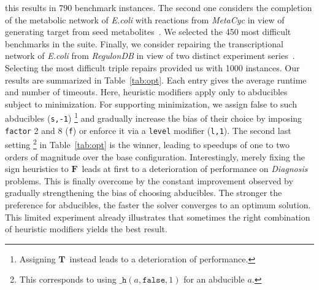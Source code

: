 \documentclass[letterpaper]{article}
\newcommand{\hpredicate}{\texttt{\_h}}
\newcommand{\hpre}[3]{\ensuremath{\hpredicate(#1,{#2},#3)}}
\newcommand{\true}{\ensuremath{\boldsymbol{T}}}
\newcommand{\false}{\ensuremath{\boldsymbol{F}}}
\begin{document}
this results in 790 benchmark instances.
The second one considers the completion of the metabolic network of \emph{E.coli} with reactions from \textit{MetaCyc} in view of generating target from seed metabolites~\cite{schthi09a}.
We selected the 450 most difficult benchmarks in the suite.
Finally, we consider repairing the transcriptional network of \emph{E.coli} from \textit{RegulonDB} in view of two distinct experiment series~\cite{geguivscsithve10a}.
Selecting the most difficult triple repairs provided us with 1000 instances.
%
Our results are summarized in Table~\ref{tab:opt}.
Each entry gives the average runtime and number of timeouts.
%
Here, heuristic modifiers apply only to abducibles subject to minimization.
%
For supporting minimization,
we assign false to such abducibles (\texttt{s,-1})%
\footnote{Assigning \true\ instead leads to a deterioration of performance.}
and gradually increase the bias of their choice by imposing \texttt{factor} 2 and 8 (\texttt{f})
or enforce it via a \texttt{level} modifier (\texttt{l,1}).
%
The second last setting%
\footnote{This corresponds to using \hpre{a}{\texttt{false}}{1} for an abducible $a$.}
in Table~\ref{tab:opt} is the winner, leading to speedups of one to two orders of magnitude over the base configuration.
Interestingly, merely fixing the sign heuristics to \false\ leads at first to a deterioration of performance on \textit{Diagnosis} problems.
This is finally overcome by the constant improvement observed by gradually strengthening the bias of choosing abducibles.
The stronger the preference for abducibles, the faster the solver converges to an optimum solution.
This limited experiment already illustrates that sometimes the right combination of heuristic
modifiers yields the best result.
\end{document}
